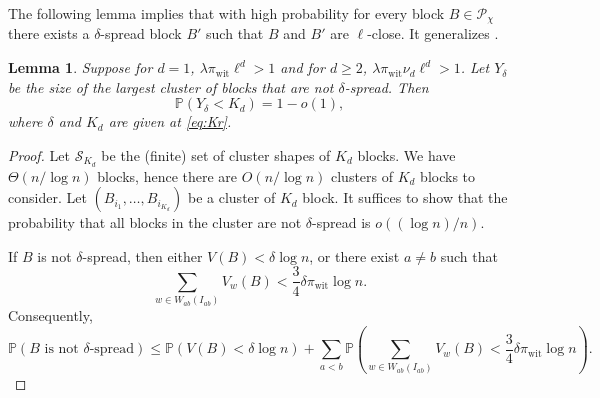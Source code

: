 \documentclass[11pt, a4paper]{amsart}
\newtheorem{lemma}[theorem]{Lemma}
\renewcommand{\P}{\mathbb{P}}
\newcommand{\1}{\mathbf{1}}
\theoremstyle{definition}
\theoremstyle{remark}
\theoremstyle{definition}
\begin{document}
The following lemma implies that with high probability for every block $B \in \mathcal P_\chi$ there exists a $\delta$-spread block $B'$ such that $B$ and $B'$ are $\ell$-close. It generalizes {\cite[Lemma C.8]{gaudio2025incguan}}.

\begin{lemma} %
\label{lemma:certified_block}
    Suppose for $d=1$, $\lambda \pi_{\mathrm{wit}} \ell^d > 1$ and for $d \geq 2$, $\lambda \pi_{\mathrm{wit}} \nu_d \ell^d > 1$. Let $Y_\delta$ be the size of the largest cluster of blocks that are not $\delta$-spread. Then 
    \[
    \P(Y_\delta < K_d)=1-o(1),
    \]
    where $\delta$ and $K_d$ are given at \eqref{eq:Kr}.
\end{lemma}

\begin{proof}
 Let $\mathcal S_{K_d}$ be the (finite) set of cluster shapes of $K_d$ blocks. We have $\Theta(n/\log n)$ blocks, hence there are $O(n/\log n)$ clusters of $K_d$ blocks to consider. Let $(B_{i_1},\ldots,B_{i_{K_d}})$ be a cluster of $K_d$ block. It suffices to show that the probability that all blocks in the cluster are not $\delta$-spread is $o((\log n)/n)$.
 
If $B$ is not $\delta$-spread, then either
$V(B)<\delta\log n$, or there exist $a\neq b$ such that
\[
\sum_{w\in W_{ab}(I_{ab})}V_w(B)
<
\frac34\delta\pi_{\mathrm{wit}}\log n.
\]
Consequently,
\[
\mathbb P(B\text{ is not }\delta\text{-spread})
\leq
\mathbb P(V(B)<\delta\log n)
+
\sum_{a<b}
\mathbb P\left(
\sum_{w\in W_{ab}(I_{ab})}V_w(B)
<
\frac34\delta\pi_{\mathrm{wit}}\log n
\right).
\]


\end{proof}
\end{document}
